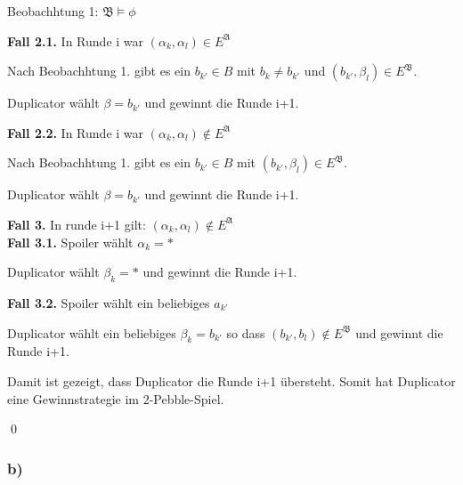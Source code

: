 \documentclass[12pt]{article}
\begin{document}
Beobachhtung 1: $ \mathfrak{B} \models \phi$

\textbf{Fall 2.1.} In Runde i war $(\alpha_k, \alpha_l) \in E^\mathfrak{A}$
    
    Nach Beobachhtung 1. gibt es ein $b_{k'} \in B$ mit $b_k \neq b_{k'}$ und 
    $(b_{k'}, \beta_l)\in E^\mathfrak{B}$.
    
    Duplicator wählt $\beta = b_{k'}$ und gewinnt die Runde i+1.
    
  \textbf{Fall 2.2.} In Runde i war $(\alpha_k, \alpha_l) \notin E^\mathfrak{A}$
    
    Nach Beobachhtung 1. gibt es ein $b_{k'} \in B$ mit $(b_{k'}, \beta_l)\in E^\mathfrak{B}$.
    
    Duplicator wählt $\beta = b_{k'}$ und gewinnt die Runde i+1.
    
\textbf{Fall 3.} In runde i+1 gilt: $(\alpha_k, \alpha_l) \notin E^\mathfrak{A}$\\
    
  \textbf{Fall 3.1.} Spoiler wählt $\alpha_k = *$
    
    Duplicator wählt $\beta_k = *$ und gewinnt die Runde i+1.
    
  \textbf{Fall 3.2.} Spoiler wählt ein beliebiges $a_{k'}$
    
    Duplicator wählt ein beliebiges $\beta_k = b_{k'}$ so dass $(b_{k'},b_l)\notin E^\mathfrak{B}$ und gewinnt die Runde i+1.
    

    Damit ist gezeigt, dass Duplicator die Runde i+1 übersteht. Somit hat Duplicator
    eine Gewinnstrategie im 2-Pebble-Spiel.
    
    \qed
    

\subsubsection*{b)}
%
%
%
%
\end{document}
